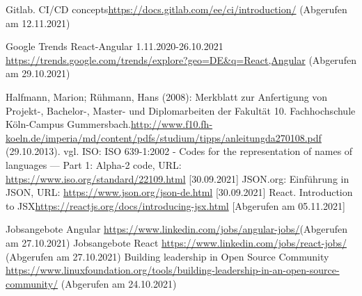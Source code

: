 \begin{thebibliography}{HR08}
Gitlab. CI/CD concepts\url{https://docs.gitlab.com/ee/ci/introduction/} (Abgerufen am 12.11.2021)

Google Trends React-Angular 1.11.2020-26.10.2021 \url{https://trends.google.com/trends/explore?geo=DE&q=React,Angular} (Abgerufen am 29.10.2021)

 Halfmann, Marion; Rühmann, Hans (2008): Merkblatt zur Anfertigung von Projekt-, Bachelor-, Master- und Diplomarbeiten der Fakultät 10. Fachhochschule Köln-Campus Gummersbach.\url{http://www.f10.fh-koeln.de/imperia/md/content/pdfs/studium/tipps/anleitungda270108.pdf} (29.10.2013).
 vgl. ISO: ISO 639-1:2002 - Codes for the representation of names of languages — Part 1: Alpha-2 code, URL: \url{https://www.iso.org/standard/22109.html} [30.09.2021]
 JSON.org: Einführung in JSON, URL: \url{https://www.json.org/json-de.html} [30.09.2021]
React. Introduction to JSX\url{https://reactjs.org/docs/introducing-jsx.html} [Abgerufen am 05.11.2021]


 Jobsangebote Angular \url{https://www.linkedin.com/jobs/angular-jobs/}(Abgerufen am 27.10.2021)
 Jobsangebote React \url{https://www.linkedin.com/jobs/react-jobs/}  (Abgerufen am 27.10.2021)
Building leadership in Open Source Community \url{https://www.linuxfoundation.org/tools/building-leadership-in-an-open-source-community/} (Abgerufen am 24.10.2021)


\end{thebibliography}
